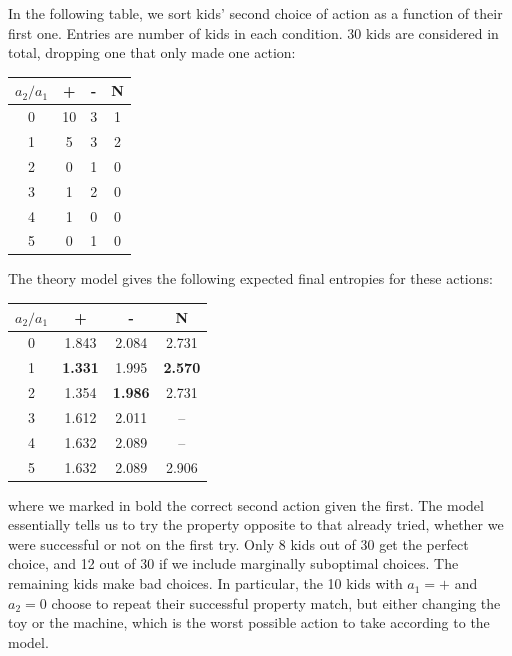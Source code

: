 \documentclass[11pt, a4paper]{article}
\begin{document}
In the following table, we sort kids' second choice of action as a function of their first one. Entries are number of kids in each condition. 30 kids are considered in total, dropping one that only made one action: 
\begin{center}
\begin{tabular}{|c||c|c|c|}
\hline
$a_2 / a_1$ & + & - & N\\
\hline\hline
0 & 10 & 3 & 1 \\ 
1 & 5 & 3 & 2 \\ 
2 & 0 & 1 & 0 \\ 
3 & 1 & 2 & 0 \\ 
4 & 1 & 0 & 0 \\ 
5 & 0 & 1 & 0 \\ 
\hline
\end{tabular}
\end{center}
The theory model gives the following expected final entropies for these actions:
\begin{center}
\begin{tabular}{|c||c|c|c|}
\hline
$a_2 / a_1$ & + & - & N\\
\hline\hline
0 & 1.843 & 2.084 & 2.731 \\ 
1 & {\bf 1.331} & 1.995 & {\bf 2.570} \\ 
2 & 1.354 & {\bf 1.986} & 2.731 \\ 
3 & 1.612 & 2.011 & -- \\ 
4 & 1.632 & 2.089 & -- \\ 
5 & 1.632 & 2.089 & 2.906 \\ 
\hline
\end{tabular}
\end{center}
where we marked in bold the correct second action given the first. The model essentially tells us to try the property opposite to that already tried, whether we were successful or not on the first try. Only 8 kids out of 30 get the perfect choice, and 12 out of 30 if we include marginally suboptimal choices. The remaining kids make bad choices. In particular, the 10 kids with $a_1=+$ and $a_2=0$ choose to repeat their successful property match, but either changing the toy or the machine, which is the worst possible action to take according to the model.
\end{document}
